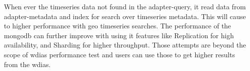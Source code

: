 When ever the timeseries data not found in the adapter-query, it read data from adapter-metadata and index for search over timeseries metadata. This will cause to higher performance with geo timeseries searches. The performance of the \acrshort{mongodb} can further improve with using it features like Replication for high availability, and Sharding for higher throughput.
Those attempts are beyond the scope of \acrshort{wdias} performance test and users can use those to get higher results from the \acrshort{wdias}.
